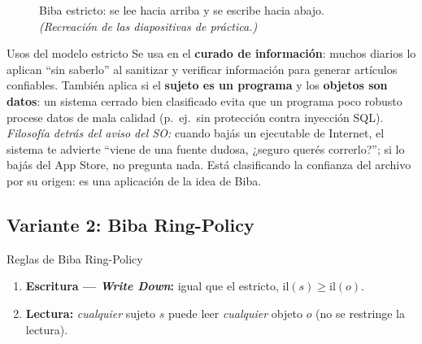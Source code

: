 \documentclass[11pt,a4paper]{article}
\newcommand{\il}{\mathrm{il}}                     %
\begin{document}
\begin{figure}[h]
\centering
{}
\caption{Biba estricto: se lee hacia arriba y se escribe hacia abajo. \textit{(Recreación de
las diapositivas de práctica.)}}
\end{figure}

\begin{practbox}{Usos del modelo estricto}
Se usa en el \textbf{curado de información}: muchos diarios lo aplican ``sin saberlo'' al
sanitizar y verificar información para generar artículos confiables. También aplica si el
\textbf{sujeto es un programa} y los \textbf{objetos son datos}: un sistema cerrado bien
clasificado evita que un programa poco robusto procese datos de mala calidad (p.\ ej.\ sin
protección contra inyección SQL). \emph{Filosofía detrás del aviso del SO:} cuando bajás un
ejecutable de Internet, el sistema te advierte ``viene de una fuente dudosa, ¿seguro querés
correrlo?''; si lo bajás del App Store, no pregunta nada. Está clasificando la confianza del
archivo por su origen: es una aplicación de la idea de Biba.
\end{practbox}

\subsection{Variante 2: Biba Ring-Policy}
\begin{defbox}{Reglas de Biba Ring-Policy}
\begin{enumerate}[leftmargin=1.7em,itemsep=3pt]
  \item \textbf{Escritura — \emph{Write Down}:} igual que el estricto, $\il(s)\ge\il(o)$.
  \item \textbf{Lectura:} \emph{cualquier} sujeto $s$ puede leer \emph{cualquier} objeto $o$
        (no se restringe la lectura).
\end{enumerate}
\end{defbox}
\end{document}

